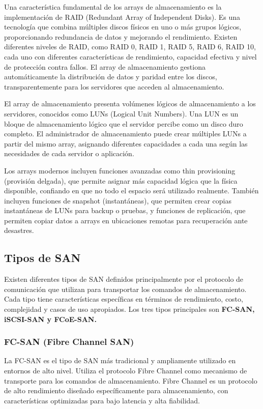 Una característica fundamental de los arrays de almacenamiento es la implementación de RAID (Redundant Array of Independent Disks). Es una tecnología que combina múltiples discos físicos en uno o más grupos lógicos, proporcionando redundancia de datos y mejorando el rendimiento. Existen diferentes niveles de RAID, como RAID 0, RAID 1, RAID 5, RAID 6, RAID 10, cada uno con diferentes características de rendimiento, capacidad efectiva y nivel de protección contra fallos. El array de almacenamiento gestiona automáticamente la distribución de datos y paridad entre los discos, transparentemente para los servidores que acceden al almacenamiento.

El array de almacenamiento presenta volúmenes lógicos de almacenamiento a los servidores, conocidos como LUNs (Logical Unit Numbers). Una LUN es un bloque de almacenamiento lógico que el servidor percibe como un disco duro completo. El administrador de almacenamiento puede crear múltiples LUNs a partir del mismo array, asignando diferentes capacidades a cada una según las necesidades de cada servidor o aplicación.

Los arrays modernos incluyen funciones avanzadas como thin provisioning (provisión delgada), que permite asignar más capacidad lógica que la física disponible, confiando en que no todo el espacio será utilizado realmente. También incluyen funciones de snapshot (instantáneas), que permiten crear copias instantáneas de LUNs para backup o pruebas, y funciones de replicación, que permiten copiar datos a arrays en ubicaciones remotas para recuperación ante desastres.

\subsection{Tipos de SAN}

Existen diferentes tipos de SAN definidos principalmente por el protocolo de comunicación que utilizan para transportar los comandos de almacenamiento. Cada tipo tiene características específicas en términos de rendimiento, costo, complejidad y casos de uso apropiados. Los tres tipos principales son \textbf{FC-SAN, iSCSI-SAN y FCoE-SAN.}

\subsubsection{FC-SAN (Fibre Channel SAN)}

La FC-SAN es el tipo de SAN más tradicional y ampliamente utilizado en entornos de alto nivel. Utiliza el protocolo Fibre Channel como mecanismo de transporte para los comandos de almacenamiento. Fibre Channel es un protocolo de alto rendimiento diseñado específicamente para almacenamiento, con características optimizadas para bajo latencia y alta fiabilidad.

